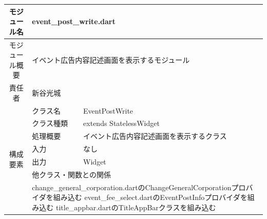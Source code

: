 \begin{table}[H]
  \centering
  \begin{tabular}{|c|l|l|} \hline
    モジュール名                & \multicolumn{2}{l|}{event\_post\_write.dart}                                                                                                   \\ \hline
    モジュール概要               & \multicolumn{2}{p{12cm}|}{イベント広告内容記述画面を表示するモジュール}                                                                                               \\ \hline
    責任者                   & \multicolumn{2}{l|}{新谷光城}                                                                                                                      \\ \hline
    \multirow{7}{*}{構成要素} & クラス名                                                                                         & EventPostWrite                                  \\ \cline{2-3}
                          & クラス種類                                                                                        & extends StatelessWidget                         \\ \cline{2-3}
                          & 処理概要                                                                                         & \multicolumn{1}{p{12cm}|}{イベント広告内容記述画面を表示するクラス} \\ \cline{2-3}
                          & 入力                                                                                           & なし                                              \\ \cline{2-3}
                          & 出力                                                                                           & Widget                                          \\ \cline{2-3}
                          & \multicolumn{2}{l|}{他クラス・関数との関係}                                                                                                               \\ \cline{2-3}
                          & \multicolumn{2}{p{14cm}|}{change\_general\_corporation.dartのChangeGeneralCorporationプロバイダを組み込む
      \newline event\_fee\_select.dartのEventPostInfoプロバイダを組み込む
      \newline title\_appbar.dartのTitleAppBarクラスを組み込む
}
\end{tabular}
\end{table}
